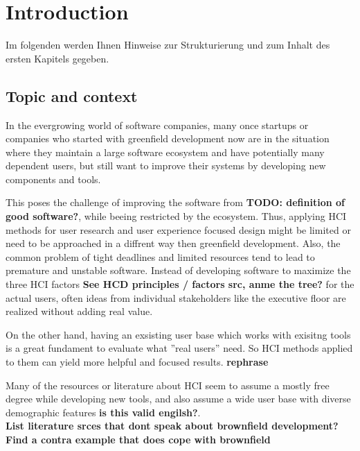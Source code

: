 %
\chapter{Introduction}
\label{chap:introduction}

Im folgenden werden Ihnen Hinweise zur Strukturierung und zum Inhalt des ersten Kapitels gegeben.

\section{Topic and context}

In the evergrowing world of software companies, many once startups or companies who started with greenfield development now are in the situation where they maintain a large software ecosystem and have potentially many dependent users,
but still want to improve their systems by developing new components and tools.

This poses the challenge of improving the software from \textbf{TODO: definition of good software?}, while beeing restricted by the ecosystem.
Thus, applying HCI methods for user research and user experience focused design might be limited or need to be approached in a diffrent way then greenfield development.
Also, the common problem of tight deadlines and limited resources tend to lead to premature and unstable software.
Instead of developing software to maximize the three HCI factors \textbf{See HCD principles / factors src, anme the tree?} for the actual users, often ideas from individual stakeholders like the executive floor are realized without adding real value.

On the other hand, having an exsisting user base which works with exisitng tools is a great fundament to evaluate what ''real users'' need. So HCI methods applied to them can yield more helpful and focused results. \textbf{rephrase}

Many of the resources or literature about HCI seem to assume a mostly free degree while developing new tools, and also assume a wide user base with diverse demographic features \textbf{is this valid engilsh?}.
\\
\textbf{List literature srces that dont speak about brownfield development?}
\textbf{Find a contra example that does cope with brownfield}
	

